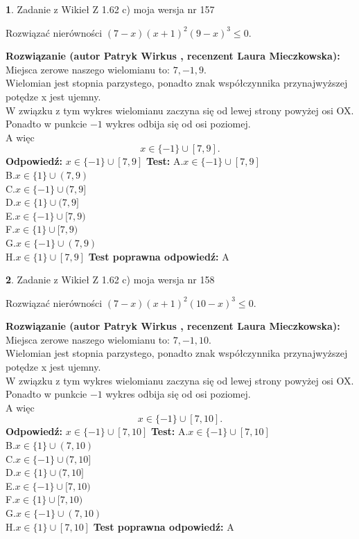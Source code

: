 \documentclass[12pt, a4paper]{article}
\theoremstyle{definition} %
\newtheorem{zad}{}
\newcommand{\zadStart}[1]{\begin{zad}#1\newline}
\newcommand{\zadStop}{\end{zad}}
\newcommand{\rozwStart}[2]{\noindent \textbf{Rozwiązanie (autor #1 , recenzent #2): }\newline}
\newcommand{\rozwStop}{\newline}
\newcommand{\odpStart}{\noindent \textbf{Odpowiedź:}\newline}
\newcommand{\odpStop}{\newline}
\newcommand{\testStart}{\noindent \textbf{Test:}\newline}
\newcommand{\testStop}{\newline}
\newcommand{\kluczStart}{\noindent \textbf{Test poprawna odpowiedź:}\newline}
\newcommand{\kluczStop}{\newline}
\begin{document}
\zadStart{Zadanie z Wikieł Z 1.62 c) moja wersja nr 157}

Rozwiązać nierówności $(7-x)(x+1)^{2}(9-x)^{3}\le0$.
\zadStop
\rozwStart{Patryk Wirkus}{Laura Mieczkowska}
Miejsca zerowe naszego wielomianu to: $7, -1, 9$.\\
Wielomian jest stopnia parzystego, ponadto znak współczynnika przy\linebreak najwyższej potędze x jest ujemny.\\ W związku z tym wykres wielomianu zaczyna się od lewej strony powyżej osi OX.\\
Ponadto w punkcie $-1$ wykres odbija się od osi poziomej.\\
A więc $$x \in \{-1\} \cup [7,9].$$
\rozwStop
\odpStart
$x \in \{-1\} \cup [7,9]$
\odpStop
\testStart
A.$x \in \{-1\} \cup [7,9]$\\
B.$x \in \{1\} \cup (7,9)$\\
C.$x \in \{-1\} \cup (7,9]$\\
D.$x \in \{1\} \cup (7,9]$\\
E.$x \in \{-1\} \cup [7,9)$\\
F.$x \in \{1\} \cup [7,9)$\\
G.$x \in \{-1\} \cup (7,9)$\\
H.$x \in \{1\} \cup [7,9]$
\testStop
\kluczStart
A
\kluczStop



\zadStart{Zadanie z Wikieł Z 1.62 c) moja wersja nr 158}

Rozwiązać nierówności $(7-x)(x+1)^{2}(10-x)^{3}\le0$.
\zadStop
\rozwStart{Patryk Wirkus}{Laura Mieczkowska}
Miejsca zerowe naszego wielomianu to: $7, -1, 10$.\\
Wielomian jest stopnia parzystego, ponadto znak współczynnika przy\linebreak najwyższej potędze x jest ujemny.\\ W związku z tym wykres wielomianu zaczyna się od lewej strony powyżej osi OX.\\
Ponadto w punkcie $-1$ wykres odbija się od osi poziomej.\\
A więc $$x \in \{-1\} \cup [7,10].$$
\rozwStop
\odpStart
$x \in \{-1\} \cup [7,10]$
\odpStop
\testStart
A.$x \in \{-1\} \cup [7,10]$\\
B.$x \in \{1\} \cup (7,10)$\\
C.$x \in \{-1\} \cup (7,10]$\\
D.$x \in \{1\} \cup (7,10]$\\
E.$x \in \{-1\} \cup [7,10)$\\
F.$x \in \{1\} \cup [7,10)$\\
G.$x \in \{-1\} \cup (7,10)$\\
H.$x \in \{1\} \cup [7,10]$
\testStop
\kluczStart
A
\kluczStop
\end{document}
